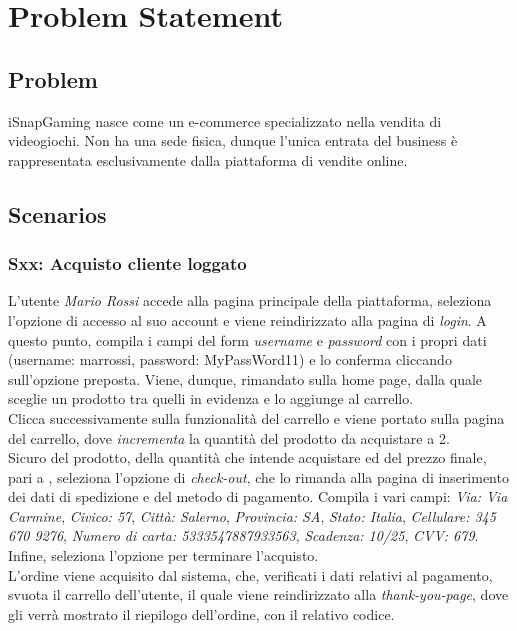 \documentclass[12pt, a4paper, oneside]{book}
\begin{document}
    \setcounter{tocdepth}{3} %

    \tableofcontents

    \chapter*{Problem Statement}
    \section*{Problem}
        iSnapGaming nasce come un e-commerce specializzato nella vendita di videogiochi. Non ha una sede fisica, dunque l'unica entrata del business è rappresentata esclusivamente dalla piattaforma di vendite online.

    \section*{Scenarios}
    \subsection*{Sxx: Acquisto cliente loggato}
        L'utente \textit{Mario Rossi} accede alla pagina principale della piattaforma, seleziona l'opzione di accesso al suo account e viene reindirizzato alla pagina di \textit{login}.
        A questo punto, compila i campi del form \textit{username} e \textit{password} con i propri dati (username: marrossi, password: MyPassWord11) e lo conferma cliccando sull'opzione preposta.
        Viene, dunque, rimandato sulla home page, dalla quale sceglie un prodotto tra quelli in evidenza e lo aggiunge al carrello.\\
        Clicca successivamente sulla funzionalità del carrello e viene portato sulla pagina del carrello, dove \textit{incrementa} la quantità del prodotto da acquistare a 2.\\
        Sicuro del prodotto, della quantità che intende acquistare ed del prezzo finale, pari a , seleziona l'opzione di \textit{check-out}, che lo rimanda
        alla pagina di inserimento dei dati di spedizione e del metodo di pagamento. Compila i vari campi: \textit{Via: Via Carmine}, \textit{Civico: 57}, \textit{Città: Salerno},
        \textit{Provincia: SA}, \textit{Stato: Italia}, \textit{Cellulare: 345 670 9276}, \textit{Numero di carta: 5333547887933563}, \textit{Scadenza: 10/25}, \textit{CVV: 679}. Infine, seleziona l'opzione per terminare l'acquisto.\\
        L'ordine viene acquisito dal sistema, che, verificati i dati relativi al pagamento, svuota il carrello dell'utente, il quale viene reindirizzato alla
        \textit{thank-you-page}, dove gli verrà mostrato il riepilogo dell'ordine, con il relativo codice.
\end{document}
